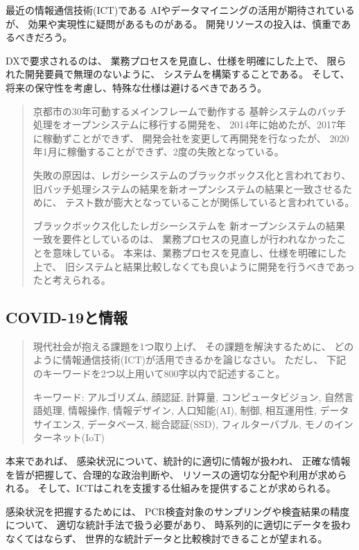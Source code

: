 \documentclass[12pt]{jsarticle}
\begin{document}
最近の情報通信技術(ICT)である
AIやデータマイニングの活用が期待されているが、
効果や実現性に疑問があるものがある。
開発リソースの投入は、慎重であるべきだろう。

DXで要求されるのは、
業務プロセスを見直し、仕様を明確にした上で、
限られた開発要員で無理のないように、
システムを構築することである。
そして、将来の保守性を考慮し、特殊な仕様は避けるべきであろう。

\begin{quotation}
京都市の30年可動するメインフレームで動作する
基幹システムのバッチ処理をオープンシステムに移行する開発を、
2014年に始めたが、2017年に稼動ずことができず、
開発会社を変更して再開発を行なったが、
2020年1月に稼働することができず、2度の失敗となっている。

失敗の原因は、レガシーシステムのブラックボックス化と言われており、
旧バッチ処理システムの結果を新オープンシステムの結果と一致させるために、
テスト数が膨大となっていることが関係していると言われている。

ブラックボックス化したレガシーシステムを
新オープンシステムの結果一致を要件としているのは、
業務プロセスの見直しが行われなかったことを意味している。
本来は、業務プロセスを見直し、仕様を明確にした上で、
旧システムと結果比較しなくても良いように開発を行うべきであったと考えられる。
\end{quotation}


\subsection{COVID-19と情報}

\begin{quotation}
現代社会が抱える課題を1つ取り上げ、
その課題を解決するために、
どのように情報通信技術(ICT)が活用できるかを論じなさい。
ただし、
下記のキーワードを2つ以上用いて800字以内で記述すること。

キーワード:
アルゴリズム,
顔認証,
計算量,
コンピュータビジョン,
自然言語処理,
情報操作,
情報デザイン,
人口知能(AI),
制御,
相互運用性,
データサイエンス,
データベース,
総合認証(SSD),
フィルターバブル,
モノのインターネット(IoT)
\end{quotation}

本来であれば、
感染状況について、統計的に適切に情報が扱われ、
正確な情報を皆が把握して、合理的な政治判断や、
リソースの適切な分配や利用が求められる。
そして、ICTはこれを支援する仕組みを提供することが求められる。

感染状況を把握するためには、
PCR検査対象のサンプリングや検査結果の精度について、
適切な統計手法で扱う必要があり、
時系列的に適切にデータを扱わなくてはならず、
世界的な統計データと比較検討できることが望まれる。
\end{document}
